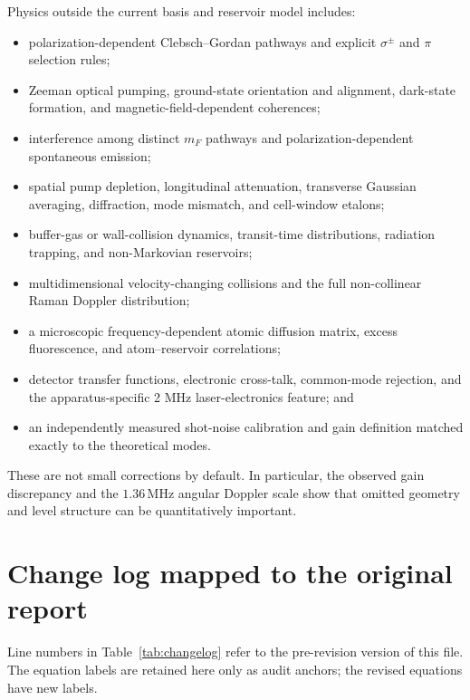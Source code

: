 \documentclass[11pt,a4paper]{article}
\newcommand{\MHz}{\,\mathrm{MHz}}
\begin{document}
Physics outside the current basis and reservoir model includes:
\begin{itemize}
\item polarization-dependent Clebsch--Gordan pathways and explicit
$\sigma^\pm$ and $\pi$ selection rules;
\item Zeeman optical pumping, ground-state orientation and alignment,
dark-state formation, and magnetic-field-dependent coherences;
\item interference among distinct $m_F$ pathways and
polarization-dependent spontaneous emission;
\item spatial pump depletion, longitudinal attenuation, transverse
Gaussian averaging, diffraction, mode mismatch, and cell-window etalons;
\item buffer-gas or wall-collision dynamics, transit-time distributions,
radiation trapping, and non-Markovian reservoirs;
\item multidimensional velocity-changing collisions and the full
non-collinear Raman Doppler distribution;
\item a microscopic frequency-dependent atomic diffusion matrix, excess
fluorescence, and atom--reservoir correlations;
\item detector transfer functions, electronic cross-talk, common-mode
rejection, and the apparatus-specific 2 MHz laser-electronics feature; and
\item an independently measured shot-noise calibration and gain definition
matched exactly to the theoretical modes.
\end{itemize}

These are not small corrections by default. In particular, the observed
gain discrepancy and the $1.36\MHz$ angular Doppler scale show that omitted
geometry and level structure can be quantitatively important.

\section{Change log mapped to the original report}
\label{app:changelog}

Line numbers in Table~\ref{tab:changelog} refer to the pre-revision
version of this file. The equation labels are retained here only as audit
anchors; the revised equations have new labels.
\end{document}
